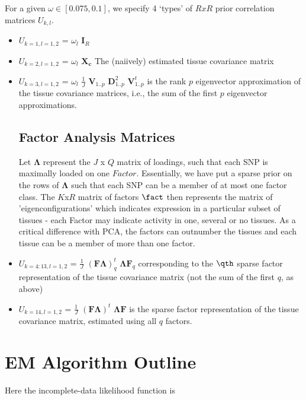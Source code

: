 \documentclass[10pt]{article}
\newcommand{\tcen}{\mathbf{X_{c}}}
\newcommand{\pcv}{\mathbf{V}}
\newcommand{\pcd}{\mathbf{D}}
\newcommand{\sfa}{\mathbf{\Lambda}\mathbf{F}}
\newcommand{\sfat}{(\mathbf{F}\mathbf{\Lambda})^{t}}
\newcommand{\load}{\mathbf{\Lambda}}
\begin{document}
For a given $\omega \in [0.075, 0.1]$, we specify 4 `types' of $RxR$ prior correlation matrices $U_{k,l}$.
\begin{itemize}

\item $U_{k=1,l=1,2}$ = $\omega_l$ $\mathbf{I}_{R}$

\item $U_{k=2,l=1,2}$ = $\omega_l$ $\tcen$ The (naiively) estimated tissue covariance matrix

\item $U_{k=3,l=1,2}$ = $\omega_l$ $\frac{1}{J}$ $\pcv_{1..p}$ $\pcd^{2}_{1..p}$   $\pcv^{t}_{1..p}$ is the rank $p$ eigenvector approximation of the tissue covariance matrices, i.e., the sum of the first $p$ eigenvector approximations.

\subsection{Factor Analysis Matrices}

Let $\load$ represent the $J$ x $Q$ matrix of loadings, such that each SNP is maximally loaded on one $Factor$. Essentially, we have put a sparse prior on the rows of $\load$ such that each SNP can be a member of at most one factor class. The $K$x$R$ matrix of factors $\fact$ then represents the matrix of 'eigenconfigurations' which indicates expression in a particular subset of tissues - each Factor may indicate activity in one, several or no tissues. As a critical difference with PCA, the factors can outnumber the tissues and each tissue can be a member of more than one factor.

\item $U_{k=4:13,l=1,2}$ = $\frac{1}{J}$ $\sfat_{q}$ $\sfa_{q}$ corresponding to the $\qth$ sparse factor representation of the tissue covariance matrix (not the sum of the first $q$, as above)
 


\item $U_{k=14,l=1,2}$ = $\frac{1}{J}$ $\sfat$ $\sfa$ is the sparse factor representation of the tissue covariance matrix, estimated using all $q$ factors.

\end{itemize}

\section{EM Algorithm Outline}

Here the incomplete-data likelihood function is
\end{document}
